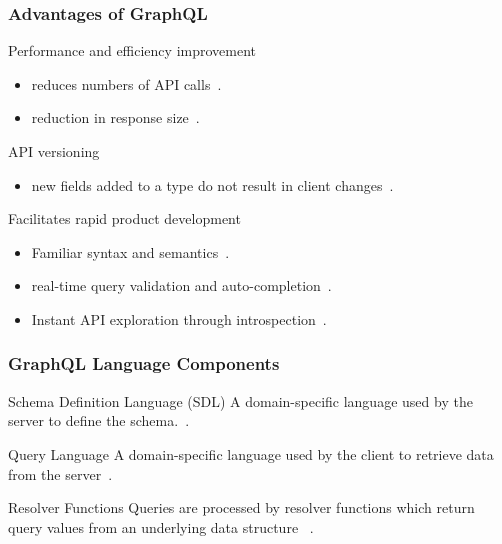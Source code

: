 \begin{frame}\frametitle{Advantages of GraphQL}

\begin{block}{Performance and efficiency improvement}
\begin{itemize}
  \item reduces numbers of API calls~\cite{migrating-to-gql}.
  \item reduction in response size~\cite{migrating-to-gql}.
\end{itemize}
\end{block}

\begin{block}{API versioning}
\begin{itemize}
  \item new fields added to a type do not result in client changes~\cite{migrating-to-gql}. 
\end{itemize}

\end{block}

\begin{block}{Facilitates rapid product development}
\begin{itemize}
  \item  Familiar syntax and semantics~\cite{rest-vs-gql-controlled-experiment}.
  \item real-time query validation and auto-completion~\cite{rest-vs-gql-controlled-experiment,migrating-to-gql}.
  \item Instant API exploration through introspection~\cite{migrating-to-gql}. 
\end{itemize}

\end{block}

\end{frame}

\begin{frame}\frametitle{GraphQL Language Components}

\begin{block}{Schema Definition Language (SDL)}
A domain-specific language used by the server to define the schema.~\cite{migrating-to-gql}.
\end{block}

\begin{block}{Query Language}
A domain-specific language used by the client to retrieve data from the server~\cite{initial-analysis-of-gql}. 
\end{block}

\begin{block}{Resolver Functions}
Queries are processed by resolver functions which return query values from an underlying data structure  ~\cite{migrating-to-gql}.
\end{block}

\end{frame}
